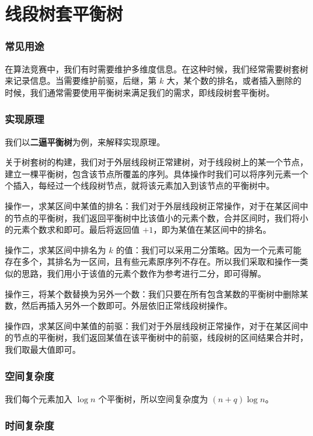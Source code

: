 
\section{线段树套平衡树}

\subsubsection{常见用途}

在算法竞赛中，我们有时需要维护多维度信息。在这种时候，我们经常需要树套树来记录信息。当需要维护前驱，后继，第 $k$ 大，某个数的排名，或者插入删除的时候，我们通常需要使用平衡树来满足我们的需求，即线段树套平衡树。

\subsubsection{实现原理}

我们以\textbf{二逼平衡树}为例，来解释实现原理。

关于树套树的构建，我们对于外层线段树正常建树，对于线段树上的某一个节点，建立一棵平衡树，包含该节点所覆盖的序列。具体操作时我们可以将序列元素一个个插入，每经过一个线段树节点，就将该元素加入到该节点的平衡树中。

操作一，求某区间中某值的排名：我们对于外层线段树正常操作，对于在某区间中的节点的平衡树，我们返回平衡树中比该值小的元素个数，合并区间时，我们将小的元素个数求和即可。最后将返回值 $+1$，即为某值在某区间中的排名。

操作二，求某区间中排名为 $k$ 的值：我们可以采用二分策略。因为一个元素可能存在多个，其排名为一区间，且有些元素原序列不存在。所以我们采取和操作一类似的思路，我们用小于该值的元素个数作为参考进行二分，即可得解。

操作三，将某个数替换为另外一个数：我们只要在所有包含某数的平衡树中删除某数，然后再插入另外一个数即可。外层依旧正常线段树操作。

操作四，求某区间中某值的前驱：我们对于外层线段树正常操作，对于在某区间中的节点的平衡树，我们返回某值在该平衡树中的前驱，线段树的区间结果合并时，我们取最大值即可。

\subsubsection{空间复杂度}

我们每个元素加入 $\log n$ 个平衡树，所以空间复杂度为 $(n + q)\log{n}$。

\subsubsection{时间复杂度}


